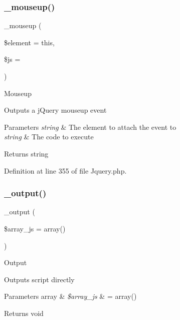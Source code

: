 \subsubsection{\texorpdfstring{\_mouseup()}{\_mouseup()}}
{\footnotesize\ttfamily \+\_\+mouseup (\begin{DoxyParamCaption}\item[{}]{\$element = {\ttfamily \textquotesingle{}this\textquotesingle{}},  }\item[{}]{\$js = {\ttfamily \textquotesingle{}\textquotesingle{}} }\end{DoxyParamCaption})\hspace{0.3cm}{\ttfamily [protected]}}

Mouseup

Outputs a j\+Query mouseup event


\begin{DoxyParams}{Parameters}
{\em string} & The element to attach the event to \\
\hline
{\em string} & The code to execute \\
\hline
\end{DoxyParams}
\begin{DoxyReturn}{Returns}
string 
\end{DoxyReturn}


Definition at line 355 of file Jquery.\+php.

\mbox{\label{class_c_i___jquery_a6a837913fb7adb3e611aa97a89d56a6e}} 
\subsubsection{\texorpdfstring{\_output()}{\_output()}}
{\footnotesize\ttfamily \+\_\+output (\begin{DoxyParamCaption}\item[{}]{\$array\+\_\+js = {\ttfamily array()} }\end{DoxyParamCaption})\hspace{0.3cm}{\ttfamily [protected]}}

Output

Outputs script directly


\begin{DoxyParams}[1]{Parameters}
array & {\em \$array\+\_\+js} & = array() \\
\hline
\end{DoxyParams}
\begin{DoxyReturn}{Returns}
void 
\end{DoxyReturn}


